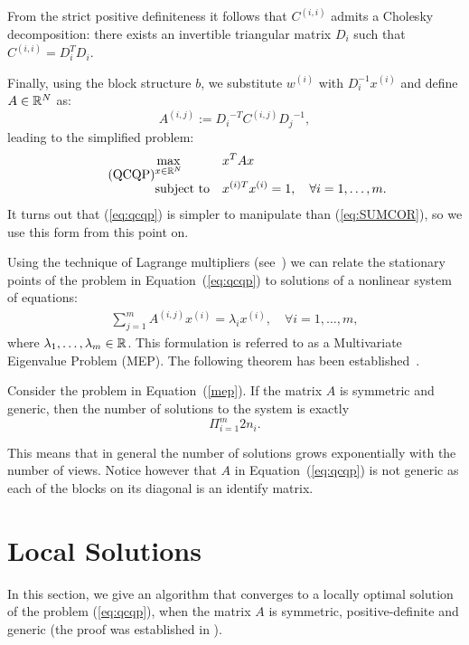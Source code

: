 From the strict positive definiteness it follows that $C^{(i,i)}$ admits a Cholesky
decomposition: there exists an invertible triangular matrix $D_i$ such that $C^{(i,i)} = D_i^T D_i$.

Finally, using the block structure $b$, we substitute $w^{(i)}$
with $D_i^{-1} x^{(i)}$ and define $A \in \mathbb{R}^N$ as:
\begin{equation*}
A^{(i,j)} := {D_i}^{-T} C^{(i,j)} {D_j}^{-1},
\end{equation*}
leading to the simplified problem:
 \begin{equation}\label{eq:qcqp}
\tag{QCQP}
\begin{aligned}
& \underset{x \in \mathbb{R}^{N}}{\text{max}}
& & x^T A x\\
& \text{subject to}
& &x^{(i)T} x^{(i)} = 1, \quad\forall i = 1, \ldots, m.
\end{aligned}
\end{equation}
It turns out that (\ref{eq:qcqp}) is simpler to  manipulate than  (\ref{eq:SUMCOR}), so we use this form from this point on.

Using the technique of Lagrange multipliers (see~\cite{Chu}) we can relate the stationary points of the problem in Equation~(\ref{eq:qcqp}) to solutions of a nonlinear system of equations:
\begin{equation}\label{mep}
\begin{aligned}
\sum_{j=1}^m A^{(i,j)}x^{(i)} = \lambda_i x^{(i)},\quad \forall i=1,\ldots,m,
\end{aligned}
\end{equation}
where $\lambda_1,\ldots,\lambda_m \in \mathbb{R}$. This formulation is referred to as a Multivariate Eigenvalue Problem (MEP). The following theorem has been established~\cite{Chu}.

\begin{theorem}
Consider the problem in Equation~(\ref{mep}). If the matrix $A$ is symmetric and generic, then
the number of solutions to the system is exactly $$\Pi_{i=1}^m 2n_i.$$
\end{theorem}
This means that in general the number of solutions grows exponentially with the number of views.
Notice however that $A$ in Equation~(\ref{eq:qcqp}) is not generic as each of the blocks on its diagonal is an identify matrix.


\section{Local Solutions}\label{chap:extensions:horst}
In this section, we give an algorithm that converges to a locally optimal
solution of the problem (\ref{eq:qcqp}), when the matrix $A$ is symmetric,
positive-definite and generic (the proof was established in \cite{Chu}).

